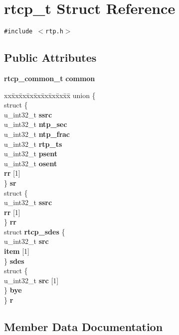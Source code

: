 \section{rtcp\_\-t Struct Reference}
\label{structrtcp__t}
{\tt \#include $<$rtp.h$>$}

\subsection*{Public Attributes}
\begin{CompactItemize}
\item 
{\bf rtcp\_\-common\_\-t} {\bf common}
\item 
\begin{tabbing}
xx\=xx\=xx\=xx\=xx\=xx\=xx\=xx\=xx\=\kill
union \{\\
\>struct \{\\
\>\>u\_int32\_t {\bf ssrc}\\
\>\>u\_int32\_t {\bf ntp\_sec}\\
\>\>u\_int32\_t {\bf ntp\_frac}\\
\>\>u\_int32\_t {\bf rtp\_ts}\\
\>\>u\_int32\_t {\bf psent}\\
\>\>u\_int32\_t {\bf osent}\\
\> {\bf rr} [1]\\
\>\} {\bf sr}\\
\>struct \{\\
\>\>u\_int32\_t {\bf ssrc}\\
\> {\bf rr} [1]\\
\>\} {\bf rr}\\
\>struct {\bf rtcp\_sdes} \{\\
\>\>u\_int32\_t {\bf src}\\
\> {\bf item} [1]\\
\>\} {\bf sdes}\\
\>struct \{\\
\>\>u\_int32\_t {\bf src} [1]\\
\>\} {\bf bye}\\
\} {\bf r}\\

\end{tabbing}\end{CompactItemize}


\subsection{Member Data Documentation}
